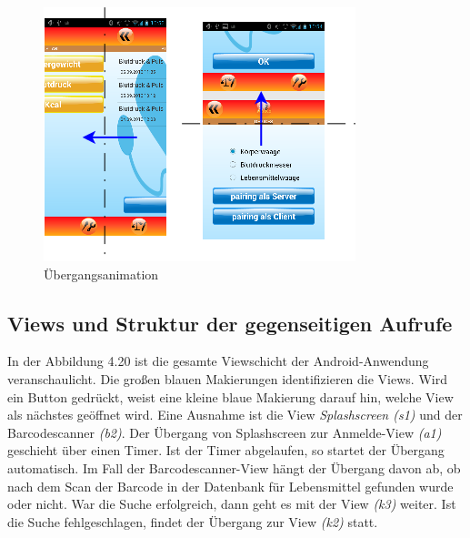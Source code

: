 \begin{figure}[h]
  \centering
  \includegraphics[scale=0.7]{screenshots/kapitel6/android/animation_richtung.png}
  \caption{\"Ubergangsanimation}
  
\end{figure}

\subsection{Views und Struktur der gegenseitigen Aufrufe}

In der Abbildung 4.20 ist die gesamte Viewschicht der Android-Anwendung veranschaulicht.
Die gro\ss{}en blauen Makierungen identifizieren die Views.
Wird ein Button gedr\"uckt, weist eine kleine blaue Makierung darauf hin, welche View als n\"achstes ge\"offnet wird.
Eine Ausnahme ist die View \emph{Splashscreen (s1)} und der Barcodescanner \emph{(b2)}.
Der \"Ubergang von Splashscreen zur Anmelde-View \emph{(a1)} geschieht \"uber einen Timer.
Ist der Timer abgelaufen, so startet der \"Ubergang automatisch.
Im Fall der Barcodescanner-View h\"angt der \"Ubergang davon ab,
ob nach dem Scan der Barcode in der Datenbank f\"ur Lebensmittel gefunden wurde oder nicht.
War die Suche erfolgreich, dann geht es mit der View \emph{(k3)} weiter.
Ist die Suche fehlgeschlagen, findet der \"Ubergang zur View \emph{(k2)} statt.\\

